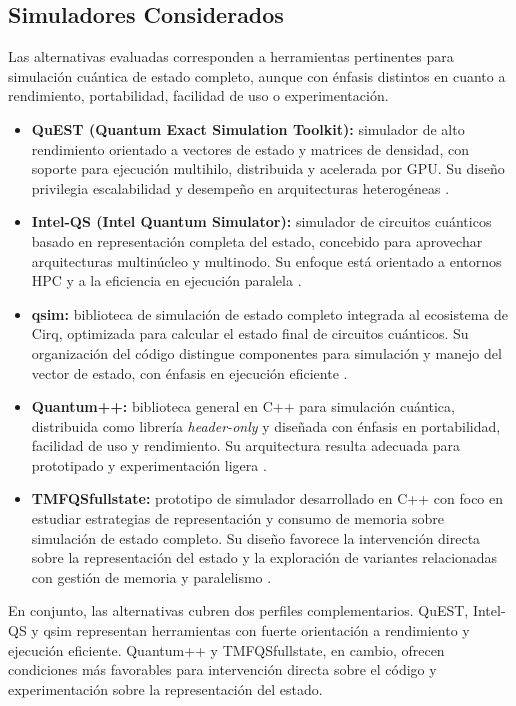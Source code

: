 \subsection{Simuladores Considerados}

Las alternativas evaluadas corresponden a herramientas pertinentes para simulación
cuántica de estado completo, aunque con énfasis distintos en cuanto a rendimiento,
portabilidad, facilidad de uso o experimentación.

\begin{itemize}
    \item \textbf{QuEST (Quantum Exact Simulation Toolkit):} simulador de alto
    rendimiento orientado a vectores de estado y matrices de densidad, con soporte
    para ejecución multihilo, distribuida y acelerada por GPU. Su diseño privilegia
    escalabilidad y desempeño en arquitecturas heterogéneas
    \parencite{Jones2019, quest_repo}.

    \item \textbf{Intel-QS (Intel Quantum Simulator):} simulador de circuitos cuánticos
    basado en representación completa del estado, concebido para aprovechar
    arquitecturas multinúcleo y multinodo. Su enfoque está orientado a entornos HPC y
    a la eficiencia en ejecución paralela \parencite{intelqs_doc}.

    \item \textbf{qsim:} biblioteca de simulación de estado completo integrada al
    ecosistema de Cirq, optimizada para calcular el estado final de circuitos cuánticos.
    Su organización del código distingue componentes para simulación y manejo del
    vector de estado, con énfasis en ejecución eficiente
    \parencite{qsim_repo, qsim_cirq}.

    \item \textbf{Quantum++:} biblioteca general en C++ para simulación cuántica,
    distribuida como librería \emph{header-only} y diseñada con énfasis en portabilidad,
    facilidad de uso y rendimiento. Su arquitectura resulta adecuada para prototipado y
    experimentación ligera \parencite{qpp_paper}.

    \item \textbf{TMFQSfullstate:} prototipo de simulador desarrollado en C++ con foco
    en estudiar estrategias de representación y consumo de memoria sobre simulación
    de estado completo. Su diseño favorece la intervención directa sobre la
    representación del estado y la exploración de variantes relacionadas con gestión de
    memoria y paralelismo
    \parencite{diaz2024software, diaz_mdpi_mmss, tmfqs_repo}.
\end{itemize}

En conjunto, las alternativas cubren dos perfiles complementarios. QuEST, Intel-QS y
qsim representan herramientas con fuerte orientación a rendimiento y ejecución
eficiente. Quantum++ y TMFQSfullstate, en cambio, ofrecen condiciones más
favorables para intervención directa sobre el código y experimentación sobre la
representación del estado.
